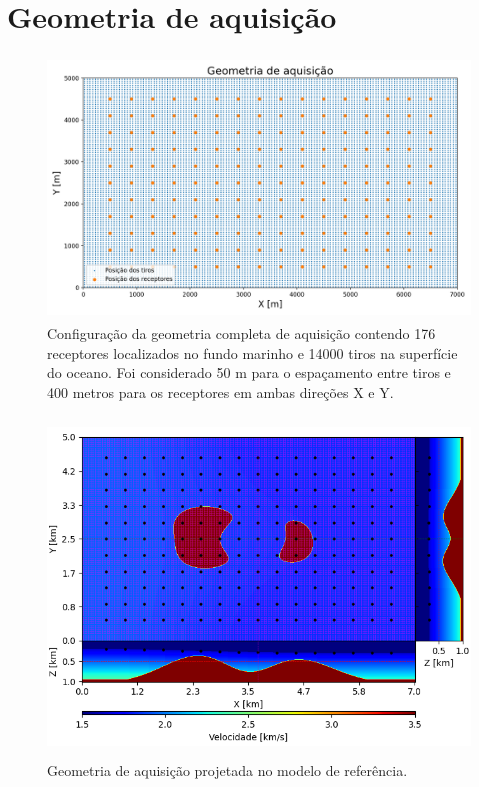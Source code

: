 \section{Geometria de aquisição}

\begin{figure}[H]
	\centering
	\includegraphics[width=12cm,height=7cm]{Imgs/Metodologia/complete_geometry.png}
	\caption{Configuração da geometria completa de aquisição contendo 176 receptores localizados no fundo marinho e 14000 tiros na superfície do oceano. Foi considerado 50 m para o espaçamento entre tiros e 400 metros para os receptores em ambas direções X e Y.}
	\label{fig:complete_geometry}	
\end{figure}


\begin{figure}[H]
	\centering
	\includegraphics[width=12cm,height=9cm]{Imgs/Metodologia/true_model_geometry.png}
	\caption{Geometria de aquisição projetada no modelo de referência.}
	\label{fig:true_model_geometry}	
\end{figure}


